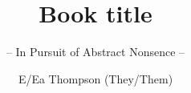 \documentclass[graybox,envcountchap,sectrefs]{style/svmono}
\begin{document}
\author{E/Ea Thompson (They/Them)}
\title{Book title}
\subtitle{-- In Pursuit of Abstract Nonsence --}
\maketitle

\frontmatter%

% 
% 

% 

\tableofcontents




\mainmatter%




\backmatter%
% 
% 
% 
\printindex

\end{document}
